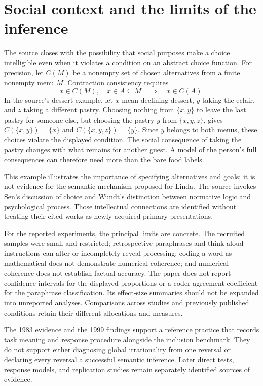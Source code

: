 \section{Social context and the limits of the inference}
\label{sec:p19-conjunction-language-limits}

The source closes with the possibility that social purposes
make a choice intelligible even when it violates a condition
on an abstract choice function.
For precision, let \(C(M)\) be a nonempty set of chosen
alternatives from a finite nonempty menu \(M\).
Contraction consistency requires
\[
       x\in C(M),\quad x\in A\subseteq M
                           \quad\Longrightarrow\quad x\in C(A).
\]
In the source's dessert example, let \(x\) mean declining dessert,
\(y\) taking the eclair, and \(z\) taking a different pastry.
Choosing nothing from
\(\{x,y\}\) to leave the last pastry for someone else,
but choosing the pastry \(y\) from \(\{x,y,z\}\), gives
\(C(\{x,y\})=\{x\}\) and \(C(\{x,y,z\})=\{y\}\).
Since \(y\) belongs to both menus, these choices violate
the displayed condition.
The social consequence of taking the pastry changes with
what remains for another guest. A model of the person's
full consequences can therefore need more than the bare
food labels.

This example illustrates the importance of specifying
alternatives and goals; it is not evidence for the
semantic mechanism proposed for Linda.
The source invokes Sen's discussion of choice and Wundt's
distinction between normative logic and psychological
process. Those intellectual connections are identified
without treating their cited works as newly acquired
primary presentations.

For the reported experiments, the principal limits are
concrete. The recruited samples were small and restricted;
retrospective paraphrases and think-aloud instructions can
alter or incompletely reveal processing; coding a word as
mathematical does not demonstrate numerical coherence;
and numerical coherence does not establish factual accuracy.
The paper does not report confidence intervals for the
displayed proportions or a coder-agreement coefficient
for the paraphrase classification. Its effect-size
summaries should not be expanded into unreported analyses.
Comparisons across studies and previously published
conditions retain their different allocations and measures.

The 1983 evidence and the 1999 findings support a reference
practice that records task meaning and response procedure
alongside the inclusion benchmark. They do not support
either diagnosing global irrationality from one reversal
or declaring every reversal a successful semantic inference.
Later direct tests, response models, and replication studies
remain separately identified sources of evidence.

